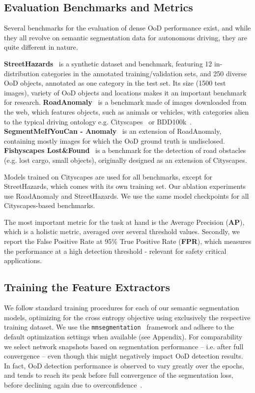\documentclass[10pt,twocolumn,letterpaper]{article}
\begin{document}
\subsection{Evaluation Benchmarks and Metrics}
Several benchmarks for the evaluation of dense OoD performance exist, and while they all revolve on semantic segmentation data for autonomous driving, they are quite different in nature. 

\textbf{StreetHazards}~\cite{a_benchmark} is a synthetic dataset and benchmark, featuring 12 in-distribution categories in the annotated training/validation sets, and 250 diverse OoD objects, annotated as one category in the test set. Its size (1500 test images), variety of OoD objects and locations makes it an important benchmark for research.
\textbf{RoadAnomaly}~\cite{lis2019detecting} is a benchmark made of images downloaded from the web, which features objects, such as animals or vehicles, with categories alien to the typical driving ontology e.g. Cityscapes~\cite{Cordts2016Cityscapes} or BDD100k~\cite{yu2018bdd100k}.
\textbf{SegmentMeIfYouCan - Anomaly}~\cite{segmentmeifyoucan2021} is an extension of RoadAnomaly, containing mostly images for which the OoD ground truth is undisclosed.
\textbf{Fishyscapes Lost\&Found}~\cite{blum2019fishyscapes} is a benchmark for the detection of road obstacles (e.g. lost cargo, small objects), originally designed as an extension of Cityscapes.

Models trained on Cityscapes are used for all benchmarks, except for StreetHazards, which comes with its own training set.
Our ablation experiments use RoadAnomaly and StreetHazards. We use the same model checkpoints for all Cityscapes-based benchmarks.

The most important metric for the task at hand is the Average Precision (\textbf{AP}), which is a holistic metric, averaged over several threshold values. Secondly, we report the False Positive Rate at 95\% True Positive Rate (\textbf{FPR}), which measures the performance at a high detection threshold - relevant for safety critical applications.

\subsection{Training the Feature Extractors}
We follow standard training procedures for each of our semantic segmentation models, optimizing for the cross entropy objective using exclusively the respective training dataset.
We use the \texttt{mmsegmentation}~\cite{mmsegmentation} framework and adhere to the default optimization settings when available (see Appendix).
For comparability we select network snapshots based on segmentation performance -- i.e. after full convergence -- even though this might negatively impact OoD detection results. In fact, OoD detection performance is observed to vary greatly over the epochs, and tends to reach its peak before full convergence of the segmentation loss, before declining again due to overconfidence~\cite{guo2017calibration}.
\end{document}

